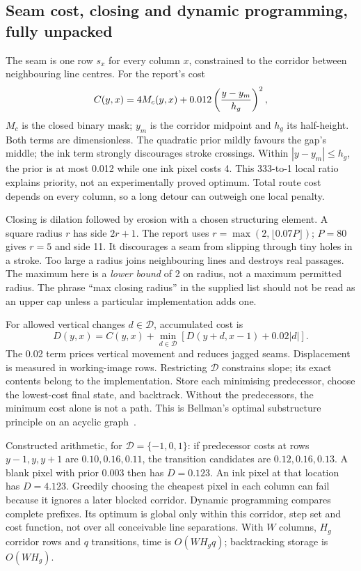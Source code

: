 \subsection{Seam cost, closing and dynamic programming, fully unpacked}
The seam is one row $s_x$ for every column $x$, constrained to the corridor
between neighbouring line centres. For the report's cost
\[
C(y,x)=4M_c(y,x)+0.012\left({y-y_m\over h_g}\right)^2,
\]
$M_c$ is the closed binary mask; $y_m$ is the corridor midpoint and $h_g$
its half-height. Both terms are dimensionless. The quadratic prior mildly
favours the gap's middle; the ink term strongly discourages stroke crossings.
Within $|y-y_m|\le h_g$, the prior is at most 0.012 while one ink pixel
costs 4. This 333-to-1 local ratio explains priority, not an experimentally
proved optimum. Total route cost depends on every column, so a long detour
can outweigh one local penalty.

Closing is dilation followed by erosion with a chosen structuring element.
A square radius $r$ has side $2r+1$. The report uses
$r=\max(2,\lfloor0.07P\rfloor)$; $P=80$ gives $r=5$ and side 11.
It discourages a seam from slipping through tiny holes in a stroke. Too
large a radius joins neighbouring lines and destroys real passages. The
maximum here is a \emph{lower bound} of 2 on radius, not a maximum permitted
radius. The phrase ``max closing radius'' in the supplied list should not be
read as an upper cap unless a particular implementation adds one.

For allowed vertical changes $d\in\mathcal D$, accumulated cost is
\[
D(y,x)=C(y,x)+\min_{d\in\mathcal D}
       [D(y+d,x-1)+0.02|d|].
\]
The 0.02 term prices vertical movement and reduces jagged seams. Displacement
is measured in working-image rows. Restricting $\mathcal D$ constrains slope;
its exact contents belong to the implementation. Store each minimising
predecessor, choose the lowest-cost final state, and backtrack. Without the
predecessors, the minimum cost alone is not a path. This is Bellman's optimal
substructure principle on an acyclic graph~\cite{bellman1954,seampaperlink}.

Constructed arithmetic, for $\mathcal D=\{-1,0,1\}$: if predecessor costs
at rows $y-1,y,y+1$ are $0.10,0.16,0.11$, the transition candidates are
$0.12,0.16,0.13$. A blank pixel with prior 0.003 then has $D=0.123$.
An ink pixel at that location has $D=4.123$. Greedily choosing the cheapest
pixel in each column can fail because it ignores a later blocked corridor.
Dynamic programming compares complete prefixes. Its optimum is global only
within this corridor, step set and cost function, not over all conceivable
line separations. With $W$ columns, $H_g$ corridor rows and $q$ transitions,
time is $O(WH_gq)$; backtracking storage is $O(WH_g)$.

